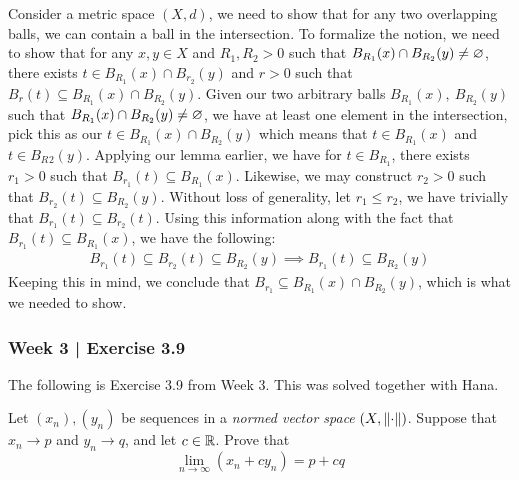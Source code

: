 \begin{pf}[source=Kabir]
    Consider a metric space $(X,d)$, we need to show that for any two overlapping
    balls, we can contain a ball in the intersection. To formalize the notion, we
    need to show that for any $x,y\in X$ and $R_1,R_2>0$ such that $B_{R_1}(x)
    \cap B_{R_2}(y)\neq\varnothing$, there exists $t\in B_{R_1}(x)\cap B_{r_2}(y)$ and
    $r>0$ such that $B_r(t)\subseteq B_{R_1}(x)\cap B_{R_2}(y)$. \vsp
    Given our two arbitrary balls $B_{R_1}(x),\ B_{R_2}(y)$ such that $B_{R_1}(x)
    \cap B_{R_2}(y) \neq\varnothing$, we have at least one element in the intersection,
    pick this as our $t\in B_{R_1}(x) \cap B_{R_2}(y)$ which means that
    $t\in B_{R_1}(x)$ and $t\in B_R{_2}(y)$. \vsp
    Applying our lemma earlier, we have for $t\in B_{R_1}$, there exists $r_1>0$
    such that $B_{r_1}(t)\subseteq B_{R_1}(x)$. Likewise, we may construct
    $r_2>0$ such that $B_{r_2}(t) \subseteq B_{R_2}(y)$.
    Without loss of generality, let $r_1\leq r_2$, we have trivially that
    $B_{r_1}(t)\subseteq B_{r_2}(t)$. Using this information along with the fact
    that $B_{r_1}(t) \subseteq B_{R_1}(x)$, we have the following:
    \begin{gather*}
        B_{r_1}(t)\subseteq B_{r_2}(t)\subseteq B_{R_2}(y)\implies B_{r_1}(t)
        \subseteq B_{R_2}(y)
    \end{gather*}
    Keeping this in mind, we conclude that $B_{r_1}\subseteq B_{R_1}(x)\cap
    B_{R_2}(y)$, which is what we needed to show.
\end{pf}

\newpage
\subsubsection{Week 3 | Exercise 3.9}

The following is Exercise 3.9 from Week 3.
This was solved together with Hana.

\begin{exr}[num=3.9]
    Let $ (x_{n}), (y_{n}) $ be sequences in a \textit{normed vector space} $
    (X, \left\|\cdot\right\|) $. Suppose that $ x_{n} \rightarrow p $ and $ y_{n}
    \rightarrow q $, and let $ c \in \mathbb{R} $. Prove that
    \begin{equation*}
        \lim_{n\rightarrow\infty} (x_{n}+cy_{n}) = p+cq
    \end{equation*}
\end{exr}

